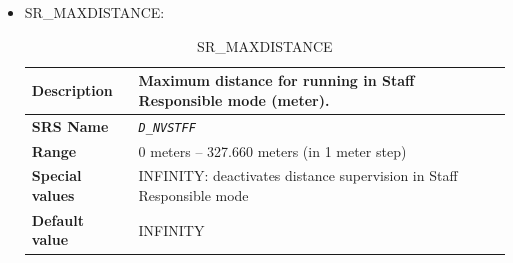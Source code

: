 \begin{itemize}
\begin{longtable}{|l|l|}
				\hline

			\end{longtable}

		\item SR\_MAXDISTANCE:

			\begin{longtable}{|l|l|}
				\caption{SR\_MAXDISTANCE}\\
				\hline

					\begin{minipage}[t]{0.22\linewidth} \textbf{Description}	\end{minipage}
				&	\begin{minipage}[t]{0.78\linewidth} Maximum distance for running in Staff Responsible mode (meter). \end{minipage} \\

				\hline

					\begin{minipage}[t]{0.22\linewidth} \textbf{SRS Name}	\end{minipage}
				&	\begin{minipage}[t]{0.78\linewidth} \emph{\texttt{D\_NVSTFF}} \end{minipage} \\

				\hline

					\begin{minipage}[t]{0.22\linewidth} \textbf{Range}	\end{minipage}
				&	\begin{minipage}[t]{0.78\linewidth} 0 meters – 327.660 meters (in 1 meter step) \end{minipage} \\

				\hline

					\begin{minipage}[t]{0.22\linewidth} \textbf{Special values}	\end{minipage}
				&	\begin{minipage}[t]{0.78\linewidth} INFINITY: deactivates distance supervision in Staff Responsible mode \end{minipage} \\

				\hline

					\begin{minipage}[t]{0.22\linewidth} \textbf{Default value}	\end{minipage}
				&	\begin{minipage}[t]{0.78\linewidth} INFINITY \end{minipage} \\


\end{longtable}
\end{itemize}
